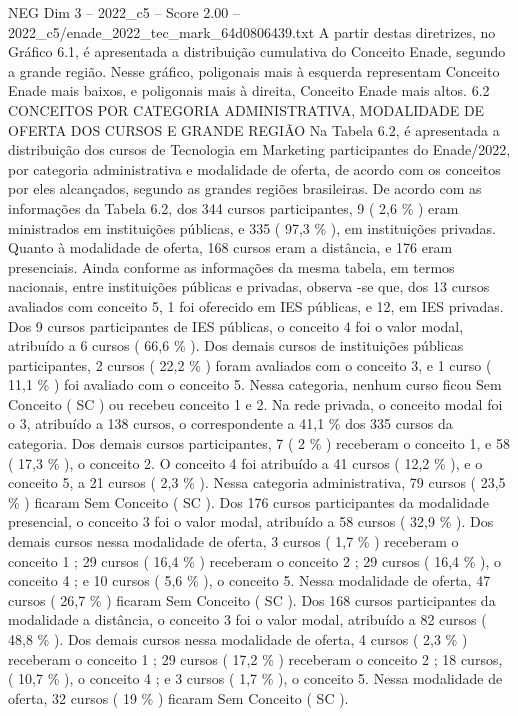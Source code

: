 \begin{textsample}{NEG Dim 3 – 2022\_c5 – Score 2.00 – 2022\_c5/enade\_2022\_tec\_mark\_64d0806439.txt}
A partir destas diretrizes, no Gráfico 6.1, é apresentada a distribuição cumulativa do Conceito Enade, segundo a grande região.
Nesse gráfico, poligonais mais à esquerda representam Conceito Enade mais baixos, e poligonais mais à direita, Conceito Enade mais altos. 6.2 CONCEITOS POR CATEGORIA ADMINISTRATIVA, MODALIDADE DE OFERTA DOS CURSOS E GRANDE REGIÃO Na Tabela 6.2, é apresentada a distribuição dos cursos de Tecnologia em Marketing participantes do Enade/2022, por categoria administrativa e modalidade de oferta, de acordo com os conceitos por eles alcançados, segundo as grandes regiões brasileiras.
De acordo com as informações da Tabela 6.2, dos 344 cursos participantes, 9 ( 2,6 \% ) eram ministrados em instituições públicas, e 335 ( 97,3 \% ), em instituições privadas.
Quanto à modalidade de oferta, 168 cursos eram a distância, e 176 eram presenciais.
Ainda conforme as informações da mesma tabela, em termos nacionais, entre instituições públicas e privadas, observa -se que, dos 13 cursos avaliados com conceito 5, 1 foi oferecido em IES públicas, e 12, em IES privadas.
Dos 9 cursos participantes de IES públicas, o conceito 4 foi o valor modal, atribuído a 6 cursos ( 66,6 \% ).
Dos demais cursos de instituições públicas participantes, 2 cursos ( 22,2 \% ) foram avaliados com o conceito 3, e 1 curso ( 11,1 \% ) foi avaliado com o conceito 5.
Nessa categoria, nenhum curso ficou Sem Conceito ( SC ) ou recebeu conceito 1 e 2.
Na rede privada, o conceito modal foi o 3, atribuído a 138 cursos, o correspondente a 41,1 \% dos 335 cursos da categoria.
Dos demais cursos participantes, 7 ( 2 \% ) receberam o conceito 1, e 58 ( 17,3 \% ), o conceito 2.
O conceito 4 foi atribuído a 41 cursos ( 12,2 \% ), e o conceito 5, a 21 cursos ( 2,3 \% ).
Nessa categoria administrativa, 79 cursos ( 23,5 \% ) ficaram Sem Conceito ( SC ).
Dos 176 cursos participantes da modalidade presencial, o conceito 3 foi o valor modal, atribuído a 58 cursos ( 32,9 \% ).
Dos demais cursos nessa modalidade de oferta, 3 cursos ( 1,7 \% ) receberam o conceito 1 ; 29 cursos ( 16,4 \% ) receberam o conceito 2 ; 29 cursos ( 16,4 \% ), o conceito 4 ; e 10 cursos ( 5,6 \% ), o conceito 5.
Nessa modalidade de oferta, 47 cursos ( 26,7 \% ) ficaram Sem Conceito ( SC ).
Dos 168 cursos participantes da modalidade a distância, o conceito 3 foi o valor modal, atribuído a 82 cursos ( 48,8 \% ).
Dos demais cursos nessa modalidade de oferta, 4 cursos ( 2,3 \% ) receberam o conceito 1 ; 29 cursos ( 17,2 \% ) receberam o conceito 2 ; 18 cursos, ( 10,7 \% ), o conceito 4 ; e 3 cursos ( 1,7 \% ), o conceito 5.
Nessa modalidade de oferta, 32 cursos ( 19 \% ) ficaram Sem Conceito ( SC ).

\end{textsample}
